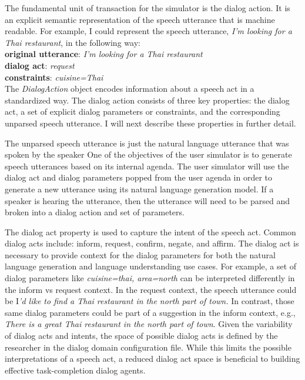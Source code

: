 The fundamental unit of transaction for the simulator is the dialog action. It is an explicit semantic representation of the speech utterance that is machine readable. For example, I could represent the speech utterance, \textit{I'm looking for a Thai restaurant}, in the following way: \\
\textbf{original utterance}: \textit{I'm looking for a Thai restaurant}   \\
\textbf{dialog act}: \textit{request}\\ 
\textbf{constraints}: \textit{cuisine=Thai}\\

The \textit{DialogAction} object encodes information about a speech act in a standardized way. The dialog action consists of three key properties: the dialog act, a set of explicit dialog parameters or constraints, and the corresponding unparsed speech utterance. I will next describe these properties in further detail. 

The unparsed speech utterance is just the natural language utterance that was spoken by the speaker One of the objectives of the user simulator is to generate speech utterances based on its internal agenda. The user simulator will use the dialog act and dialog parameters popped from the user agenda in order to generate a new utterance using its natural language generation model. If a speaker is hearing the utterance, then the utterance will need to be parsed and broken into a dialog action and set of parameters. 

The dialog act property is used to capture the intent of the speech act. Common dialog acts include: inform, request, confirm, negate, and affirm. The dialog act is necessary to provide context for the dialog parameters for both the natural language generation and language understanding use cases. For example, a set of dialog parameters like \textit{{cuisine=thai, area=north}} can be interpreted differently in the inform vs request context. In the request context, the speech utterance could be I\textit{'d like to find a Thai restaurant in the north part of town.} In contrast, those same dialog parameters could be part of a suggestion in the inform context, e.g., \textit{There is a great Thai restaurant in the north part of town}. Given the variability of dialog acts and intents, the space of possible dialog acts is defined by the researcher in the dialog domain configuration file. While this limits the possible interpretations of a speech act, a reduced dialog act space is beneficial to building effective task-completion dialog agents.  

